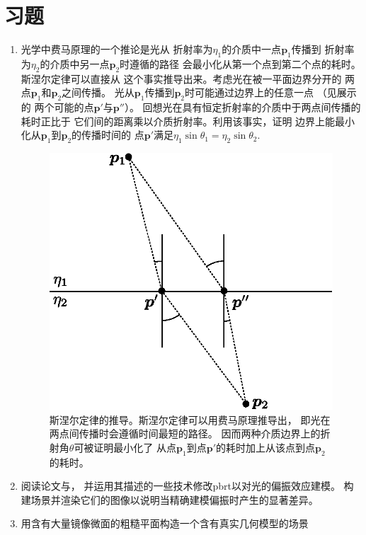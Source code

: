 \section{习题}\label{sec:习题08}
\begin{enumerate}
    \item \circleone 光学中费马原理的一个推论是光从
          折射率为$\eta_1$的介质中一点$\bm{p}_1$传播到
          折射率为$\eta_2$的介质中另一点$\bm{p}_2$时遵循的路径
          会最小化从第一个点到第二个点的耗时。斯涅尔定律可以直接从
          这个事实推导出来。考虑光在被一平面边界分开的
          两点$\bm{p}_1$和$\bm{p}_2$之间传播。
          光从$\bm{p}_1$传播到$\bm{p}_2$时可能通过边界上的任意一点
          （见展示的
          两个可能的点$\bm{p}'$与$\bm{p}''$）。
          回想光在具有恒定折射率的介质中于两点间传播的耗时正比于
          它们间的距离乘以介质折射率。利用该事实，证明
          边界上能最小化从$\bm{p}_1$到$\bm{p}_2$的传播时间的
          点$\bm{p}'$满足$\eta_1\sin\theta_1=\eta_2\sin\theta_2$.
          \begin{figure}[htbp]
              \centering\includegraphics[width=0.5\linewidth]{Pictures/chap08/Fermatsprinciple.eps}
              \caption{斯涅尔定律的推导。斯涅尔定律可以用费马原理推导出，
                  即光在两点间传播时会遵循时间最短的路径。
                  因而两种介质边界上的折射角$\theta$可被证明最小化了
                  从点$\bm{p}_1$到点$\bm{p}'$的耗时加上从该点到点$\bm{p}_2$的耗时。}
              \label{fig:8.25}
          \end{figure}
    \item \circlethree 阅读论文\citet{10.1109/38.62695}与\citet{10.1145/192161.192204}，
          并运用其描述的一些技术修改pbrt以对光的偏振效应建模。
          构建场景并渲染它们的图像以说明当精确建模偏振时产生的显著差异。
    \item \circlethree 用含有大量镜像微面的粗糙平面构造一个含有真实几何模型的场景

\end{enumerate}
